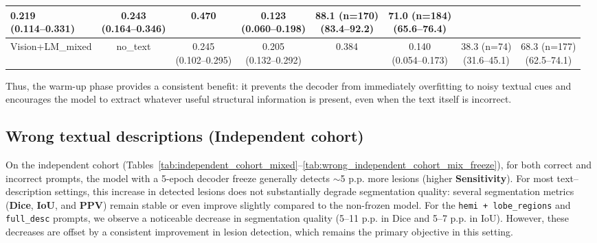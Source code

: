 \documentclass[FCD_GNN.tex]{subfiles}
\begin{document}
\begin{table}[H]
\begin{tabular}{lccccccc}
\makecell{0.219 \\ (0.114--0.331)} &
\makecell{\colorbox{green!15}{0.243} \\ (0.164--0.346)} &
\colorbox{orange!15}{0.470} &
\makecell{0.123 \\ (0.060--0.198)} &
\makecell{88.1 (n=170) \\ (83.4--92.2)} &
\makecell{71.0 (n=184) \\ (65.6--76.4)} \\
\hline
Vision+LM\_mixed & 
no\_text &
\makecell{\colorbox{cyan!15}{0.245} \\ (0.102--0.295)} &
\makecell{0.205 \\ (0.132--0.292)} &
0.384 &
\makecell{\colorbox{cyan!15}{0.140} \\ (0.054--0.173)} &
\makecell{38.3 (n=74) \\ (31.6--45.1)} &
\makecell{68.3 (n=177) \\ (62.5--74.1)} \\
\hline
\end{tabular}
\end{table}

Thus, the warm-up phase provides a consistent benefit: it prevents the decoder from immediately 
overfitting to noisy textual cues and encourages the model to extract whatever useful 
structural information is present, even when the text itself is incorrect.



\subsection*{Wrong textual descriptions (Independent cohort)}
On the independent cohort (Tables~\ref{tab:independent_cohort_mixed}--\ref{tab:wrong_independent_cohort_mix_freeze}), 
for both correct and incorrect prompts, the model with a 5-epoch decoder freeze generally detects 
$\sim$5 \ac{p.p.} more lesions (higher \textbf{Sensitivity}).  
For most text--description settings, this increase in detected lesions does not substantially 
degrade segmentation quality: several segmentation metrics (\textbf{Dice}, \textbf{IoU}, and \textbf{PPV}) remain stable or even improve 
slightly compared to the non-frozen model. 
For the \texttt{hemi + lobe\_regions} and \texttt{full\_desc} prompts, we observe a noticeable decrease 
in segmentation quality (5--11 \ac{p.p.} in Dice and 5--7 \ac{p.p.} in IoU).  
However, these decreases are offset by a consistent improvement in lesion detection, which remains 
the primary objective in this setting.
\end{document}
